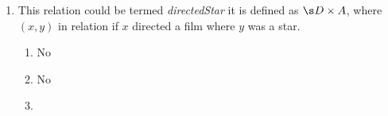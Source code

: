 \begin{questions}
\begin{solution}
\begin{enumerate}[label=(\alph*),itemsep=2pt,parsep=0pt,topsep=0pt,partopsep=0pt]
\begin{enumerate}[label=(\roman*),itemsep=2pt,parsep=0pt,topsep=0pt,partopsep=0pt]
		\end{enumerate}
		\item This relation could be termed \textit{directedStar} it is defined as $\s D \times A$, where $(x,y)$ in relation if $x$ directed a film where $y$ was a star. 
		\begin{enumerate}[label=(\roman*),itemsep=2pt,parsep=0pt,topsep=0pt,partopsep=0pt]
			\item No 
			\item No 
			\item 
		\end{enumerate}
    \end{enumerate}
    \end{solution}









\end{questions}
